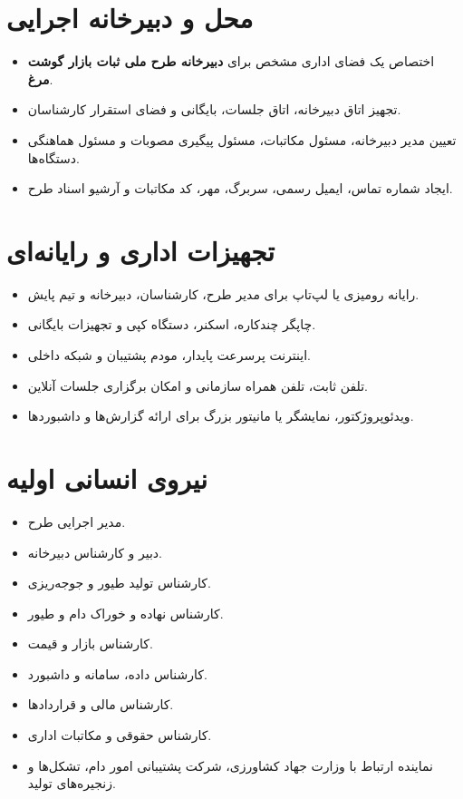 \documentclass[12pt,a4paper]{report}
\begin{document}
\section{محل و دبیرخانه اجرایی}
\begin{itemize}
    \item اختصاص یک فضای اداری مشخص برای \textbf{دبیرخانه طرح ملی ثبات بازار گوشت مرغ}.
    \item تجهیز اتاق دبیرخانه، اتاق جلسات، بایگانی و فضای استقرار کارشناسان.
    \item تعیین مدیر دبیرخانه، مسئول مکاتبات، مسئول پیگیری مصوبات و مسئول هماهنگی دستگاه‌ها.
    \item ایجاد شماره تماس، ایمیل رسمی، سربرگ، مهر، کد مکاتبات و آرشیو اسناد طرح.
\end{itemize}

\section{تجهیزات اداری و رایانه‌ای}
\begin{itemize}
    \item رایانه رومیزی یا لپ‌تاپ برای مدیر طرح، کارشناسان، دبیرخانه و تیم پایش.
    \item چاپگر چندکاره، اسکنر، دستگاه کپی و تجهیزات بایگانی.
    \item اینترنت پرسرعت پایدار، مودم پشتیبان و شبکه داخلی.
    \item تلفن ثابت، تلفن همراه سازمانی و امکان برگزاری جلسات آنلاین.
    \item ویدئوپروژکتور، نمایشگر یا مانیتور بزرگ برای ارائه گزارش‌ها و داشبوردها.
\end{itemize}

\section{نیروی انسانی اولیه}
\begin{itemize}
    \item مدیر اجرایی طرح.
    \item دبیر و کارشناس دبیرخانه.
    \item کارشناس تولید طیور و جوجه‌ریزی.
    \item کارشناس نهاده و خوراک دام و طیور.
    \item کارشناس بازار و قیمت.
    \item کارشناس داده، سامانه و داشبورد.
    \item کارشناس مالی و قراردادها.
    \item کارشناس حقوقی و مکاتبات اداری.
    \item نماینده ارتباط با وزارت جهاد کشاورزی، شرکت پشتیبانی امور دام، تشکل‌ها و زنجیره‌های تولید.
\end{itemize}
\end{document}
